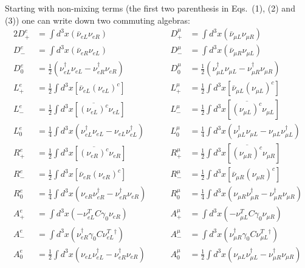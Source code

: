 \documentclass[a4paper,12pt]{article}
\begin{document}
Starting with non-mixing terms (the first two 
parenthesis in Eqs.~(1), (2) and (3)) one can write down 
two commuting \coordHE{} algebras:
\def\intt{{\textstyle \int}}
\def\half{{\textstyle\frac{1}{2}}}
\def\fourth{{\textstyle\frac{1}{4}}}
\begin{alignat}{2}
D_{+}^{e} &=\intt d^{3}{x}( \bar{\nu}_{eL}\nu_{eR}) & \qquad
D_{+}^{\mu }&=\intt d^{3}{x}( \bar{\nu}_{\mu L}\nu_{\mu R})
\nonumber \\[0.3cm]
D_{-}^{e} &=\intt d^{3}{x}( \bar{\nu}_{eR}\nu_{eL}) & \qquad
D_{-}^{\mu }&=\intt d^{3}{x}( \bar{\nu}_{\mu R}\nu_{\mu L})
\nonumber \\[0.3cm]
D_{0}^{e}&=\half(\nu_{eL}^{\dagger }
\nu_{eL}-\nu_{eR}^{\dagger }\nu_{eR}) & \qquad D_{0}^{\mu }
&=\half(\nu_{\mu L}^{\dagger }
\nu_{\mu L}-\nu_{\mu R}^{\dagger }\nu_{\mu R})\nonumber \\[0.3cm]
L_{+}^{e}&=\half\intt d^{3}{x}[\bar{\nu}_{eL}
(\nu_{eL})^{c}]  & \qquad L_{+}^{\mu }&=\half\intt d^{3}{x}
[\bar{\nu}_{\mu L}(\nu_{\mu L})^{c}]\nonumber \\[0.3cm]
L_{-}^{e}&=\half\intt d^{3}{x}[\overline{(\nu_{eL})^{c}}
\nu_{eL}] & \qquad L_{-}^{\mu }
&=\half\intt d^{3}{x}[\overline{(\nu_{\mu L})^{c}}%
\nu_{\mu L}]\nonumber \\[0.3cm]
L_{0}^{e}&=\fourth\intt d^{3}{x}(\nu_{eL}^{\dagger }\nu_{eL}-\nu
_{eL}\nu_{eL}^{\dagger }) & \qquad L_{0}^{\mu }&=\fourth \intt d^{3}{x}(\nu
_{\mu L}^{\dagger }\nu_{\mu L}-\nu_{\mu L}\nu_{\mu L}^{\dagger })
\nonumber \\[0.3cm]
R_{+}^{e}&=\half\intt d^{3}{x}[\overline{(\nu_{eR})^{c}}
\nu_{eR}] & \qquad R_{+}^{\mu }
&=\half\intt d^{3}{x}[\overline{(\nu_{\mu R})^{c}}%
\nu_{\mu R}] \\[0.3cm]
R_{-}^{e}&=\half\intt d^{3}{x}[\bar{\nu}_{eR}(\nu_{eR})^{c}] 
& \qquad R_{-}^{\mu }
&=\half\intt d^{3}{x}[\bar{\nu}_{\mu R}(\nu_{\mu R})^{c}] 
\nonumber \\[0.3cm]
R_{0}^{e}&=\fourth \intt d^{3}{x}(\nu_{eR}\nu_{eR}^{\dagger }
-\nu_{eR}^{\dagger }\nu_{eR}) & \qquad 
R_{0}^{\mu }&=\fourth \intt d^{3}{x}(\nu_{\mu R}\nu_{\mu R}^{\dagger }
-\nu_{\mu R}^{\dagger }\nu_{\mu R}) 
\nonumber \\[0.3cm]
A_{+}^{e}&=\intt d^{3}{x}( -\nu_{eL}^{T}C\gamma_{0}\nu_{eR}) 
 & \qquad A_{+}^{\mu }
&=\intt d^{3}{x}(-\nu_{\mu L}^{T}C\gamma_{0}\nu_{\mu R})
\nonumber \\[0.3cm]
A_{-}^{e}&=\intt d^{3}{x}(\nu_{eR}^{\dagger}\gamma_{0}C\nu_{eL}^{T}
{}^{\dagger })
 & \qquad 
A_{-}^{\mu }&=\intt d^{3}{x}(\nu_{\mu R}^{\dagger }
\gamma_{0}C\nu_{\mu L}^{T}{}^{\dagger })\nonumber \\[0.3cm]
A_{0}^{e}&=\half\intt d^{3}{x}(\nu_{eL}\nu_{eL}^{\dagger }
-\nu_{eR}^{\dagger }\nu_{eR}) & \qquad A_{0}^{\mu }
&=\half\intt d^{3}{x}(\nu_{\mu L}\nu_{\mu L}^{\dagger }
-\nu_{\mu R}^{\dagger }\nu_{\mu R}) \nonumber
\end{alignat}
\end{document}
